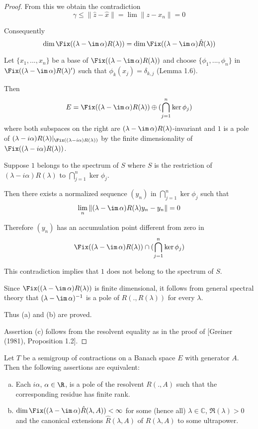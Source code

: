 \begin{proof}
From this we obtain the contradiction
\[
\gamma \leq \|\hat{z} - \hat{x}\| = \lim \|z - x_{n}\| = 0
\]

Consequently
\[
\dim \Fix((\lambda - \im\,\alpha)R(\lambda)) = \dim \Fix((\lambda - \im\,\alpha)\hat{R}(\lambda))
\]

Let $\{x_{1},...,x_{n}\}$ be a base of $\Fix((\lambda - \im\,\alpha)R(\lambda))$ and choose $\{\phi_{1},...,\phi_{n}\}$ in $\Fix((\lambda - \im\,\alpha)R(\lambda)')$ such that $\phi_{k}(x_{j}) = \delta_{k,j}$ (Lemma 1.6).

Then
\[
E = \Fix((\lambda - \im\,\alpha)R(\lambda)) \oplus (\bigcap_{j=1}^{n} \ker\phi_{j})
\]
where both subspaces on the right are $(\lambda - \im\,\alpha)R(\lambda)$-invariant and $1$ is a pole of $(\lambda-i\alpha)R(\lambda)|_{\Fix((\lambda-i\alpha)R(\lambda))}$ by the finite dimensionality of $\Fix((\lambda-i\alpha)R(\lambda))$.

Suppose $1$ belongs to the spectrum of $S$ where $S$ is the restriction of $(\lambda-i\alpha)R(\lambda)$ to $\bigcap_{j=1}^{n} \ker\phi_{j}$.

Then there exists a normalized sequence $(y_{n})$ in $\bigcap_{j=1}^{n} \ker\phi_{j}$ such that
\[
\lim_{n} \|(\lambda - \im\,\alpha)R(\lambda)y_{n} - y_{n}\| = 0
\]

Therefore $(y_{n})$ has an accumulation point different from zero in
\[
\Fix((\lambda - \im\,\alpha)R(\lambda)) \cap (\bigcap_{j=1}^{n} \ker\phi_{j})
\]

This contradiction implies that $1$ does not belong to the spectrum of $S$.

Since $\Fix((\lambda - \im\,\alpha)R(\lambda))$ is finite dimensional, it follows from general spectral theory that $(\lambda - \im\,\alpha)^{-1}$ is a pole of $R(.,R(\lambda))$ for every $\lambda$.

Thus (a) and (b) are proved.

Assertion (c) follows from the resolvent equality as in the proof of [Greiner (1981), Proposition 1.2].

\end{proof}




\begin{proposition}\label{prop:d3-2.3}
Let $T$ be a semigroup of contractions on a Banach space $E$ with generator $A$.
Then the following assertions are equivalent:
\begin{enumerate}[(a)]
\item
Each $i\alpha$, $\alpha \in \R$, is a pole of the resolvent $R(.,A)$ such that the corresponding residue has finite rank.
\item
$\dim \Fix((\lambda - \im\,\alpha)\hat{R}(\lambda,A)) < \infty$ for some (hence all) $\lambda \in \mathbb{C}$, $\Re(\lambda) > 0$ and the canonical extensions $\hat{R}(\lambda,A)$ of $R(\lambda,A)$ to some ultrapower.
\end{enumerate}
\end{proposition}

